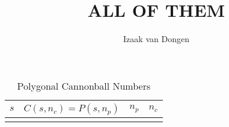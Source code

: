 \documentclass[fleqn,a4paper,11pt]{article}
\title{ALL OF THEM}
\author{Izaak van Dongen}
\begin{document}
\maketitle\thispagestyle{empty} %
\tableofcontents

\begin{longtable}{*4r}
\toprule
\boldmath \(s\) & \boldmath \(C(s, n_c) = P(s, n_p)\)
& \boldmath \(n_p\) & \boldmath \(n_c\) \\
\midrule
\endhead

\bottomrule
\caption{Polygonal Cannonball Numbers}
\label{tab_ugly}
\end{longtable}
\end{document}
